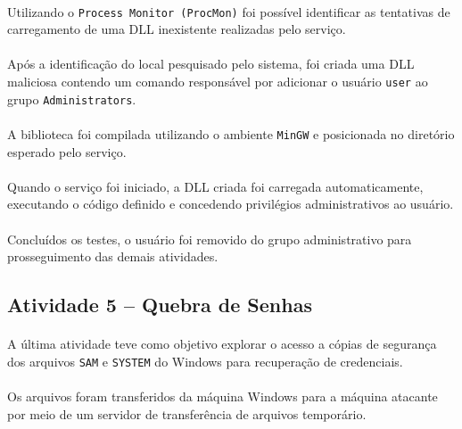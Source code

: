 \paragraph{}
Utilizando o \texttt{Process Monitor (ProcMon)} foi possível identificar as
tentativas de carregamento de uma DLL inexistente realizadas pelo serviço.

\paragraph{}
Após a identificação do local pesquisado pelo sistema, foi criada uma DLL
maliciosa contendo um comando responsável por adicionar o usuário
\texttt{user} ao grupo \texttt{Administrators}.

\paragraph{}
A biblioteca foi compilada utilizando o ambiente \texttt{MinGW} e posicionada
no diretório esperado pelo serviço.

\paragraph{}
Quando o serviço foi iniciado, a DLL criada foi carregada automaticamente,
executando o código definido e concedendo privilégios administrativos ao
usuário.

\paragraph{}
Concluídos os testes, o usuário foi removido do grupo administrativo para
prosseguimento das demais atividades.

\subsection{Atividade 5 -- Quebra de Senhas}

\paragraph{}
A última atividade teve como objetivo explorar o acesso a cópias de segurança
dos arquivos \texttt{SAM} e \texttt{SYSTEM} do Windows para recuperação de
credenciais.

\paragraph{}
Os arquivos foram transferidos da máquina Windows para a máquina atacante por
meio de um servidor de transferência de arquivos temporário.

